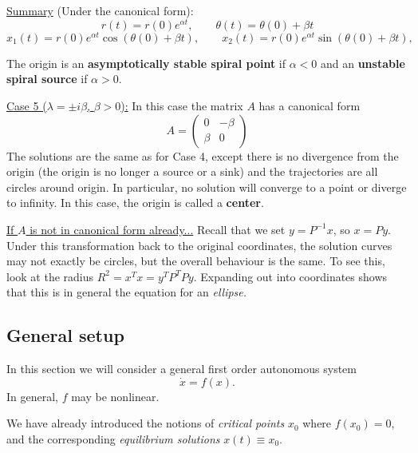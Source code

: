 \documentclass[11pt, letterpaper, oneside]{article}     %
\numberwithin{equation}{subsection}
\theoremstyle{definition}
\numberwithin{theorem}{section}
\theoremstyle{remark}
\begin{document}
\underline{Summary} (Under the canonical form):
\begin{equation}
  r(t) = r(0)e^{\alpha t},\quad\quad\theta(t)=\theta(0) + \beta t
\end{equation}
\begin{equation}
  x_1(t) = r(0)e^{\alpha t}\cos(\theta(0) + \beta t),\quad\quad
  x_2(t) = r(0)e^{\alpha t}\sin(\theta(0) + \beta t),\quad\quad
\end{equation}

The origin is an \textbf{asymptotically stable spiral point} if $\alpha < 0$ and an \textbf{unstable spiral source} if $\alpha > 0$.

\bigskip

\noindent
\underline{Case 5 ($\lambda = \pm i\beta$, $\beta> 0$):}
In this case the matrix $A$ has a canonical form
\begin{equation}
  A =
  \begin{pmatrix}
    0 & -\beta\\
    \beta & 0
  \end{pmatrix}
\end{equation}
The solutions are the same as for Case 4, except there is no divergence from the origin (the origin is no longer a source or a sink) and the trajectories are all circles around origin. In particular, no solution will converge to a point or diverge to infinity. In this case, the origin is called a \textbf{center}.

\underline{If $A$ is not in canonical form already...} Recall that we set $y = P^{-1}x$, so $x = Py$. Under this transformation back to the original coordinates, the solution curves may not exactly be circles, but the overall behaviour is the same. To see this, look at the radius $R^2 = x^T x = y^T P^TP y$. Expanding out into coordinates shows that this is in general the equation for an \emph{ellipse.}

\bigskip

\subsection{General setup}\label{sec:critical-points-general-setup}

In this section we will consider a general first order autonomous system
\begin{equation}\label{eq:first-order-autonomous}
  \dot x = f(x).
\end{equation}
In general, $f$ may be nonlinear.

We have already introduced the notions of \emph{critical points} $x_0$ where $f(x_0) = 0$, and the corresponding \emph{equilibrium solutions} $x(t) \equiv x_0$.
\end{document}
